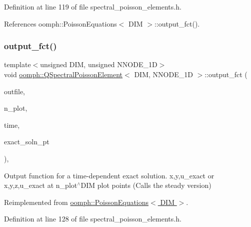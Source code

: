 Definition at line 119 of file spectral\+\_\+poisson\+\_\+elements.\+h.



References oomph\+::\+Poisson\+Equations$<$ D\+I\+M $>$\+::output\+\_\+fct().

\mbox{\label{classoomph_1_1QSpectralPoissonElement_aa18ae34af7cc2aee225d5e30a76edb10}} 
\subsubsection{\texorpdfstring{output\+\_\+fct()}{output\_fct()}\hspace{0.1cm}{\footnotesize\ttfamily [2/2]}}
{\footnotesize\ttfamily template$<$unsigned D\+IM, unsigned N\+N\+O\+D\+E\+\_\+1D$>$ \\
void \hyperlink{classoomph_1_1QSpectralPoissonElement}{oomph\+::\+Q\+Spectral\+Poisson\+Element}$<$ D\+IM, N\+N\+O\+D\+E\+\_\+1D $>$\+::output\+\_\+fct (\begin{DoxyParamCaption}\item[{std\+::ostream \&}]{outfile,  }\item[{const unsigned \&}]{n\+\_\+plot,  }\item[{const double \&}]{time,  }\item[{\hyperlink{classoomph_1_1FiniteElement_ad4ecf2b61b158a4b4d351a60d23c633e}{Finite\+Element\+::\+Unsteady\+Exact\+Solution\+Fct\+Pt}}]{exact\+\_\+soln\+\_\+pt }\end{DoxyParamCaption})\hspace{0.3cm}{\ttfamily [inline]}, {\ttfamily [virtual]}}



Output function for a time-\/dependent exact solution. x,y,u\+\_\+exact or x,y,z,u\+\_\+exact at n\+\_\+plot$^\wedge$\+D\+IM plot points (Calls the steady version) 



Reimplemented from \hyperlink{classoomph_1_1PoissonEquations_a6d98964a14b38f4b2e89a2744478f706}{oomph\+::\+Poisson\+Equations$<$ D\+I\+M $>$}.



Definition at line 128 of file spectral\+\_\+poisson\+\_\+elements.\+h.



